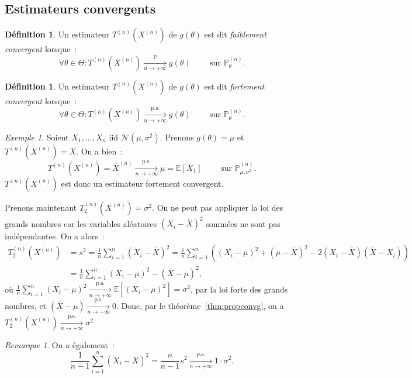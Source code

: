 \documentclass{report}
\renewcommand{\P}{\mathbb P}
\newcommand{\E}{\mathbb E}
\newcommand{\pinfty}{{+\infty}}
\newcommand{\cvgp}{\xrightarrow[n \to \pinfty]{\P}}
\newcommand{\cvgps}{\xrightarrow[n \to \pinfty]{\text{p.s.}}}
\newcommand{\Nms}{\mathcal N(\mu, \sigma^2)}
\theoremstyle{definition}
\newtheorem{déf}[thm]{Définition}
\theoremstyle{remark}
\newtheorem*{rmq}{Remarque}
\newtheorem{ex}{Exemple}[chapter]
\begin{document}
		\subsection{Estimateurs convergents}
			\begin{déf} Un estimateur $T^{(n)}(X^{(n)})$ de $g(\theta)$ est dit \textit{faiblement convergent} lorsque~:
			\[\forall \theta \in \Theta : T^{(n)}(X^{(n)}) \cvgp g(\theta) \qquad \text{ sur }\P_\theta^{(n)}.\]
			\end{déf}
			
			\begin{déf} Un estimateur $T^{(n)}(X^{(n)})$ de $g(\theta)$ est dit \textit{fortement convergent} lorsque~:
			\[\forall \theta \in \Theta : T^{(n)}(X^{(n)}) \cvgps g(\theta)\qquad \text{ sur }\P_\theta^{(n)}.\]
			\end{déf}
			
			\begin{ex} Soient $X_1, \ldots, X_n$ iid $\Nms$. Prenons $g(\theta) = \mu$ et $T^{(n)}(X^{(n)}) = \overline X$. On a bien~:
			\[T^{(n)}(X^{(n)}) = \overline X^{(n)} \cvgps \mu = \E[X_1] \qquad \text{ sur }\P_{\mu, \sigma^2}^{(n)}.\]
			$T^{(n)}(X^{(n)})$ est donc un estimateur fortement convergent.
			
			Prenons maintenant $T_2^{(n)}(X^{(n)}) = \sigma^2$. On ne peut pas appliquer la loi des grands nombres car les variables aléatoires $(X_i - \overline X)^2$
			sommées ne sont pas indépendantes. On a alors~:
			\begin{align*}
				T_2^{(n)}(X^{(n)}) &= s^2 = \frac 1n\sum_{i=1}^n(X_i-\overline X)^2
					= \frac 1n\sum_{i=1}^n\left((X_i - \mu)^2 + (\mu - \overline X)^2 - 2(X_i - \overline X)(\overline X - X_i)\right) \\
				&= \frac 1n\sum_{i=1}^n(X_i - \mu)^2 - (\overline X - \mu)^2,
			\end{align*}
			où $\frac 1n\sum_{i=1}^n(X_i-\mu)^2 \cvgps \E\left[(X_i - \mu)^2\right] = \sigma^2$, par la loi forte des grands nombres,
			et $(\overline X - \mu) \cvgps 0$. Donc, par le théorème~\ref{thm:propconvg}, on a $T_2^{(n)}(X^{(n)}) \cvgps \sigma^2$
			\end{ex}
			
			\begin{rmq} On a également~:
			\[\frac 1{n-1}\sum_{i=1}^n(X_i-\overline X)^2 = \frac n{n-1}s^2 \cvgps 1 \cdot \sigma^2.\]
			\end{rmq}
			
\end{document}
